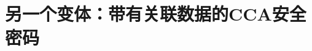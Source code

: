 \section{另一个变体：带有关联数据的CCA安全密码}\label{sec:9-6}

\begin{definition}\label{def:9-10}
	
\end{definition}

\begin{theorem}\label{theo:9-5}
	
\end{theorem}